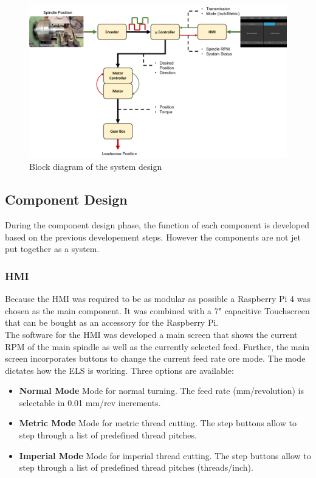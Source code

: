 \begin{figure}
    \begin{center}
    \includegraphics[width=12cm]{Pictures/SystemDesign.png}
    \caption[Block diagram of the system design]{Block diagram of the system design}
    \label{System design}
    \end{center}
\end{figure}


\subsection{Component Design}
During the component design phase, the function of each component is developed based on the previous developement steps. However the components are not jet put together as a system.

\subsubsection{HMI}
Because the HMI was required to be as modular as possible a Raspberry Pi 4 was chosen as the main component. It was combined with a 7" capacitive Touchscreen that can be bought as an accessory for the Raspberry Pi.\\
The software for the HMI was developed a main screen that shows the current RPM of the main spindle as well as the currently selected feed. Further, the main screen incorporates buttons to change the current feed rate ore mode. The mode dictates how the ELS is working. Three options are available: 

\begin{itemize}
    \item \textbf{Normal Mode} Mode for normal turning. The feed rate (mm/revolution) is selectable in 0.01 mm/rev increments.
    \item \textbf{Metric Mode} Mode for metric thread cutting. The step buttons allow to step through a list of predefined thread pitches.
    \item \textbf{Imperial Mode} Mode for imperial thread cutting. The step buttons allow to step through a list of predefined thread pitches (threads/inch).
\end{itemize}

